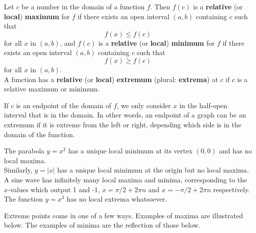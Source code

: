 \documentclass{book}
\begin{document}
\begin{Def} Let $c$ be a number in the domain of a function $f$. Then $f(c)$ is a \textbf{relative}  (or \textbf{local}) \textbf{maximum} for $f$ if there exists an open interval $(a,b)$ containing $c$ such that 
\[f(x) \le f(c)\] for all $x$ in $(a,b)$, and $f(c)$ is a \textbf{relative} (or \textbf{local}) \textbf{minimum} for $f$ if there exists an open interval $(a,b)$ containing $c$ such that 
\[f(x) \ge f(c)\] for all $x$ in $(a,b)$.\\

A function has a \textbf{relative} (or \textbf{local}) \textbf{extremum} (plural: \textbf{extrema}) at $c$ if $c$ is a relative maximum or minimum.
\end{Def}\vs

If $c$ is an endpoint of the domain of $f$, we only consider $x$ in the half-open interval that is in the domain. In other words, an endpoint of a graph can be an extremum if it is extreme from the left or right, depending which side is in the domain of the function.


\begin{Exam} The parabola $y =x^2$ has a unique local minimum at its vertex $(0,0)$ and has no local maxima.\\

Similarly, $y = |x|$ has a unique local minimum at the origin but no local maxima.\\

A sine wave has infinitely many local maxima and minima, corresponding to the $x$-values which output 1 and -1, $x = \pi/2 + 2\pi n$ and $x = -\pi/2 + 2\pi n$ respectively.\\

The function $y = x^3$ has no local extrema whatsoever. 
\end{Exam}\vs

Extreme points come in one of a few ways. Examples of maxima are illustrated below. The examples of minima are the reflection of those below. 
\end{document}
